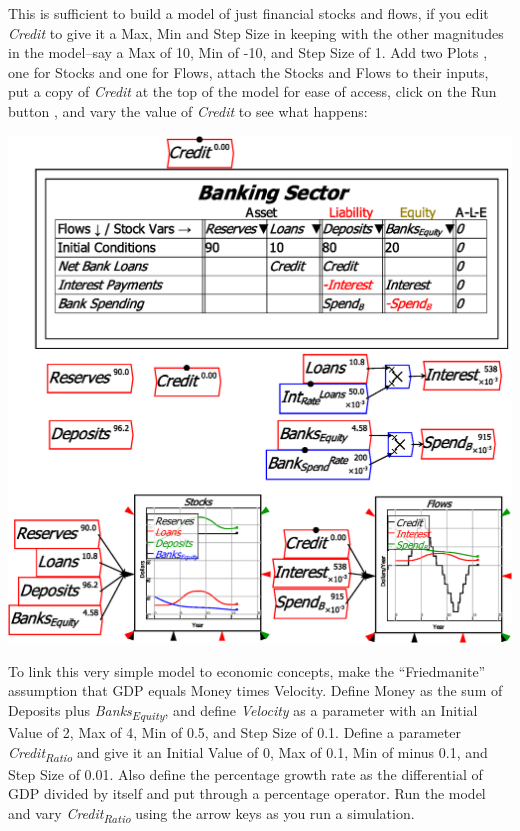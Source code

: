 This is sufficient to build a model of just financial stocks and flows,
if you edit \emph{Credit} to give it a Max, Min and Step Size in keeping
with the other magnitudes in the model--say a Max of 10, Min of -10,
and Step Size of 1. Add two Plots ,
one for Stocks and one for Flows, attach the Stocks and Flows to their
inputs, put a copy of \emph{Credit} at the top of the model for ease
of access, click on the Run button , and
vary the value of \emph{Credit }to see what happens:

\noindent\includegraphics[width=\textwidth]{images/MonetaryModel01GodleyTable06Simulate01}

To link this very simple model to economic concepts, make the ``Friedmanite''
assumption that GDP equals Money times Velocity. Define Money as the
sum of Deposits plus \emph{Banks}\textsubscript{\emph{Equity}},
and define \emph{Velocity} as a parameter with an Initial Value of
2, Max of 4, Min of 0.5, and Step Size of 0.1. Define a parameter
\emph{Credit}\textsubscript{\emph{Ratio}} and give it an Initial
Value of 0, Max of 0.1, Min of minus 0.1, and Step Size of 0.01. Also
define the percentage growth rate as the differential of GDP divided
by itself and put through a percentage operator. Run the model and
vary \emph{Credit}\textsubscript{\emph{Ratio}} using the arrow keys
as you run a simulation.

